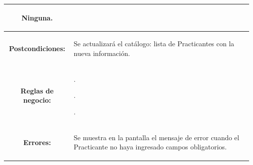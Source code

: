 \begin{table}[H]
\begin{tabular}{| c | p{12 cm} |}
							\begin{compactitem}
								\setlength\itemsep{-0.25em}
								\item Ninguna.
							\end{compactitem}\\
\hline
\textbf{Postcondiciones:} & \vspace{-2mm}	%
							\begin{compactitem}
								\item Se actualizará el catálogo: lista de Practicantes con la nueva información.
							\end{compactitem}\\
\hline
\textbf{Reglas de negocio:} & \vspace{-2mm}	%
							\begin{compactitem}
								\item \nameref{rn:RNR01}.
								\item \nameref{rn:RNR09}.
								\item \nameref{rn:RNR31}.
							\end{compactitem}\\	
\hline
\textbf{Errores:} & \vspace{-2mm}	%
					\begin{compactitem}
						\setlength\itemsep{-0.25em}
						\item Se muestra en la pantalla \nameref{pant:IUP02.1} el mensaje de error \nameref{msj:MSG12} cuando el Practicante no haya ingresado campos obligatorios.
					\end{compactitem}\\							
\hline
\end{tabular}
\end{table} 


